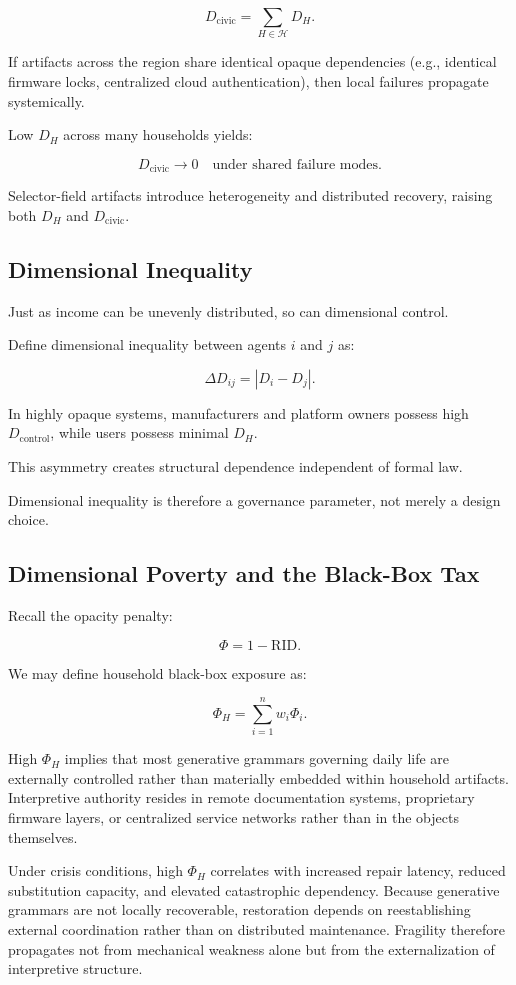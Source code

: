 \documentclass[11pt]{article}
\begin{document}
\[
D_{\text{civic}} = \sum_{H \in \mathcal{H}} D_H.
\]

If artifacts across the region share identical opaque dependencies
(e.g., identical firmware locks, centralized cloud authentication),
then local failures propagate systemically.

Low $D_H$ across many households yields:

\[
D_{\text{civic}} \rightarrow 0 \quad \text{under shared failure modes}.
\]

Selector-field artifacts introduce heterogeneity and distributed recovery,
raising both $D_H$ and $D_{\text{civic}}$.

\subsection{Dimensional Inequality}

Just as income can be unevenly distributed, so can dimensional control.

Define dimensional inequality between agents $i$ and $j$ as:

\[
\Delta D_{ij} = |D_i - D_j|.
\]

In highly opaque systems, manufacturers and platform owners possess
high $D_{\text{control}}$, while users possess minimal $D_H$.

This asymmetry creates structural dependence independent of formal law.

Dimensional inequality is therefore a governance parameter,
not merely a design choice.

\subsection{Dimensional Poverty and the Black-Box Tax}

Recall the opacity penalty:

\[
\Phi = 1 - \text{RID}.
\]

We may define household black-box exposure as:

\[
\Phi_H = \sum_{i=1}^{n} w_i \Phi_i.
\]

High $\Phi_H$ implies that most generative grammars governing daily life
are externally controlled rather than materially embedded within
household artifacts. Interpretive authority resides in remote
documentation systems, proprietary firmware layers, or centralized
service networks rather than in the objects themselves.

Under crisis conditions, high $\Phi_H$ correlates with increased repair
latency, reduced substitution capacity, and elevated catastrophic
dependency. Because generative grammars are not locally recoverable,
restoration depends on reestablishing external coordination rather than
on distributed maintenance. Fragility therefore propagates not from
mechanical weakness alone but from the externalization of interpretive
structure.
\end{document}
